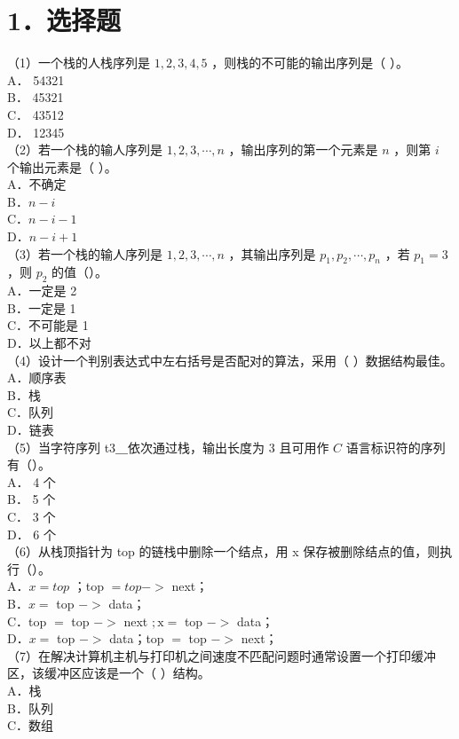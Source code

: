 \documentclass[10pt]{article}
\begin{document}
\section*{1．选择题}
（1）一个栈的人栈序列是 $1,2,3,4,5$ ，则栈的不可能的输出序列是（ ）。\\
A． 54321\\
B． 45321\\
C． 43512\\
D． 12345\\
（2）若一个栈的输人序列是 $1,2,3, \cdots, n$ ，输出序列的第一个元素是 $n$ ，则第 $i$ 个输出元素是（ ）。\\
A．不确定\\
B．$n-i$\\
C．$n-i-1$\\
D．$n-i+1$\\
（3）若一个栈的输人序列是 $1,2,3, \cdots, n$ ，其输出序列是 $p_{1}, p_{2}, \cdots, p_{n}$ ，若 $p_{1}=3$ ，则 $p_{2}$ 的值（）。\\
A．一定是 2\\
B．一定是 1\\
C．不可能是 1\\
D．以上都不对\\
（4）设计一个判别表达式中左右括号是否配对的算法，采用（ ）数据结构最佳。\\
A．顺序表\\
B．栈\\
C．队列\\
D．链表\\
（5）当字符序列 t3＿依次通过栈，输出长度为 3 且可用作 $C$ 语言标识符的序列有（）。\\
A． 4 个\\
B． 5 个\\
C． 3 个\\
D． 6 个\\
（6）从栈顶指针为 top 的链栈中删除一个结点，用 x 保存被删除结点的值，则执行（）。\\
A．$x=t o p$ ；top $=t o p->$ next；\\
B．$x=$ top $->$ data；\\
C．top $=$ top $->$ next $; \mathrm{x}=$ top $->$ data；\\
D．$x=$ top $->$ data；top $=$ top $->$ next；\\
（7）在解决计算机主机与打印机之间速度不匹配问题时通常设置一个打印缓冲区，该缓冲区应该是一个（ ）结构。\\
A．栈\\
B．队列\\
C．数组\\
\end{document}
